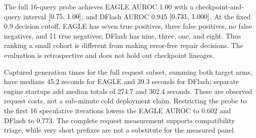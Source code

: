 The full 16-query probe achieves EAGLE AUROC 1.00 with a checkpoint-and-query interval $[0.75,\,1.00]$, and DFlash AUROC 0.945 $[0.731,\,1.000]$. At the fixed 0.9 decision cutoff, EAGLE has seven true positives, three false positives, no false negatives, and 11 true negatives; DFlash has nine, three, one, and eight. Thus ranking a small cohort is different from making error-free repair decisions. The evaluation is retrospective and does not hold out checkpoint lineages.

Captured generation times for the full request subset, summing both target arms, have medians 45.2 seconds for EAGLE and 39.3 seconds for DFlash; separate engine startups add median totals of 274.7 and 302.4 seconds. These are observed request costs, not a sub-minute cold deployment claim. Restricting the probe to the first 16 speculative iterations lowers the EAGLE AUROC to 0.602 and DFlash to 0.773. The complete request measurement supports compatibility triage, while very short prefixes are not a substitute for the measured panel.
